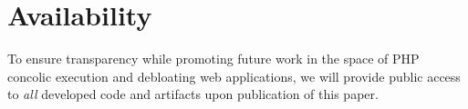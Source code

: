 \section{Availability}

To ensure transparency while promoting future work in the space of PHP concolic execution and debloating web applications, we will provide public access to \emph{all} developed code and artifacts upon publication of this paper. 